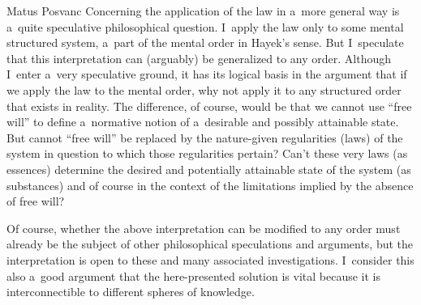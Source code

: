\begin{artengenv}{Matus Posvanc}
Concerning the application of the law in a~more general way is a~quite speculative philosophical question. I~apply the law only to some mental structured system, a~part of the mental order in Hayek's sense. But I~speculate that this interpretation can (arguably) be generalized to any order. Although I~enter a~very speculative ground, it has its logical basis in the argument that if we apply the law to the mental order, why not apply it to any structured order that exists in reality. The difference, of course, would be that we cannot use ``free will'' to define a~normative notion of a~desirable and possibly attainable state. But cannot ``free will'' be replaced by the nature-given regularities (laws) of the system in question to which those regularities pertain? Can't these very laws (as essences) determine the desired and potentially attainable state of the system (as substances) and of course in the context of the limitations implied by the absence of free will?



Of course, whether the above interpretation can be modified to any order must already be the subject of other philosophical speculations and arguments, but the interpretation is open to these and many associated investigations. I~consider this also a~good argument that the here-presented solution is vital because it is interconnectible to different spheres of knowledge.
\enlargethispage{2.5\baselineskip}



\renewcommand{\figurename}{Figure}
\end{artengenv}

\label{posvanc-last}